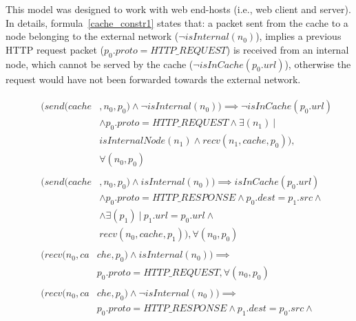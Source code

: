 This model was designed to work with web end-hosts (i.e., web client and server). In details, formula~\ref{cache_constr1} states that: a packet sent from the cache to a node belonging to the external network (\textit{$\neg isInternal(n_{0})$}), implies a previous HTTP request packet (\textit{$p_{0}.proto = HTTP\_REQUEST$}) is received from an internal node, which cannot be served by the cache (\textit{$\neg isInCache(p_{0}.url)$}), otherwise the request would have not been forwarded towards the external network. 

\begin{figure}[h]

	{\footnotesize
		\begin{subequations}
			\begin{align}
			\begin{split}
			\label{cache_constr1}
			(send(cache&, n_{0}, p_{0}) \wedge \neg isInternal(n_{0})) \implies \neg isInCache(p_{0}.url) \\
			& \wedge p_{0}.proto = HTTP\_REQUEST \wedge \exists ( n_{1}) \: | \:  \\
			&  isInternalNode(n_{1}) \wedge recv(n_{1}, cache, p_{0})), \\
			& \forall (n_{0}, p_{0})
			\end{split} \\
			\begin{split}
			\label{cache_constr2}
			(send(cache&, n_{0}, p_{0}) \wedge isInternal(n_{0})) \implies isInCache(p_{0}.url) \\
			& \wedge p_{0}.proto = HTTP\_RESPONSE \wedge p_{0}.dest = p_{1}.src \wedge \\
			& \wedge \exists  (p_{1}) \: | \:  p_{1}.url = p_{0}.url \wedge\\
			&  recv(n_{0}, cache, p_{1})), \forall (n_{0}, p_{0})			
			\end{split} \\
			\begin{split}
			\label{cache_constr4}
			(recv(n_{0},ca&che, p_{0}) \wedge isInternal(n_{0})) \implies  \\
			&  p_{0}.proto = HTTP\_REQUEST , \forall (n_{0}, p_{0})			
			\end{split} \\
			\begin{split}
			\label{cache_constr5}
			(recv( n_{0},ca&che, p_{0}) \wedge \neg isInternal(n_{0})) \implies \\
			&  p_{0}.proto = HTTP\_RESPONSE \wedge p_{1}.dest = p_{0}.src \wedge \\

\end{split}
\end{align}
\end{subequations}}
\end{figure}
